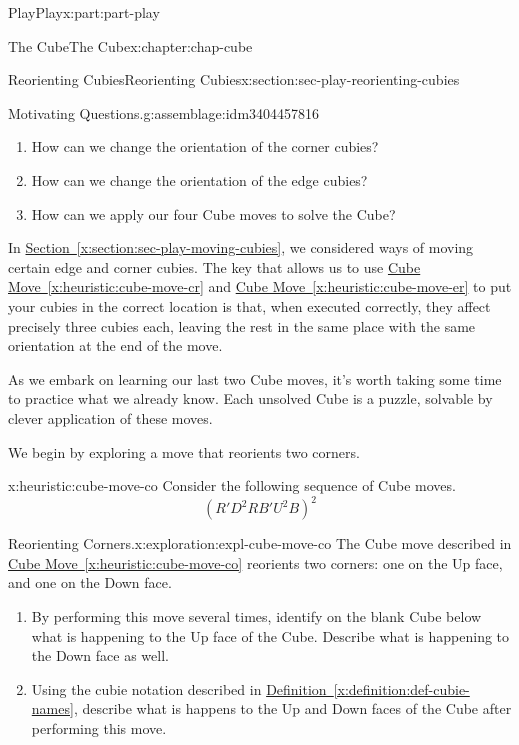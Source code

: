 \documentclass[oneside,10pt,]{book}
\newcommand{\xreffont}{\relax}
\numberwithin{equation}{section}
\begin{document}
\begin{partptx}{Play}{}{Play}{}{}{x:part:part-play}
\begin{chapterptx}{The Cube}{}{The Cube}{}{}{x:chapter:chap-cube}
\begin{sectionptx}{Reorienting Cubies}{}{Reorienting Cubies}{}{}{x:section:sec-play-reorienting-cubies}
\begin{assemblage}{Motivating Questions.}{g:assemblage:idm3404457816}
\begin{enumerate}
\item{}How can we change the orientation of the corner cubies?%
\item{}How can we change the orientation of the edge cubies?%
\item{}How can we apply our four Cube moves to solve the Cube?%
\end{enumerate}
%
\end{assemblage}
\begin{introduction}{}%
In \hyperref[x:section:sec-play-moving-cubies]{Section~{\xreffont\ref{x:section:sec-play-moving-cubies}}}, we considered ways of moving certain edge and corner cubies. The key that allows us to use \hyperref[x:heuristic:cube-move-cr]{Cube Move~{\xreffont\ref{x:heuristic:cube-move-cr}}} and \hyperref[x:heuristic:cube-move-er]{Cube Move~{\xreffont\ref{x:heuristic:cube-move-er}}} to put your cubies in the correct location is that, when executed correctly, they affect precisely three cubies each, leaving the rest in the same place with the same orientation at the end of the move.%
\par
As we embark on learning our last two Cube moves, it's worth taking some time to practice what we already know. Each unsolved Cube is a puzzle, solvable by clever application of these moves.%
\end{introduction}%
We begin by exploring a move that reorients two corners.%
\begin{heuristic}{}{}{x:heuristic:cube-move-co}%
%
Consider the following sequence of Cube moves.%
%
\begin{equation*}
(R' D^2 R B' U^2 B)^2
\end{equation*}
\end{heuristic}
\begin{exploration}{Reorienting Corners.}{x:exploration:expl-cube-move-co}%
The Cube move described in \hyperref[x:heuristic:cube-move-co]{Cube Move~{\xreffont\ref{x:heuristic:cube-move-co}}} reorients two corners: one on the Up face, and one on the Down face.%
%
\begin{enumerate}
\item{}By performing this move several times, identify on the blank Cube below what is happening to the Up face of the Cube. Describe what is happening to the Down face as well.%
\item{}Using the cubie notation described in \hyperref[x:definition:def-cubie-names]{Definition~{\xreffont\ref{x:definition:def-cubie-names}}}, describe what is happens to the Up and Down faces of the Cube after performing this move.%

\end{enumerate}
\end{exploration}
\end{sectionptx}
\end{chapterptx}
\end{partptx}
\end{document}
